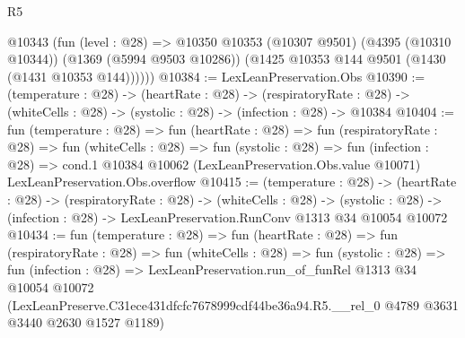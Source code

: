 \begin{lexlean}{R5}
\begin{coremodule}
      @10343
        (fun (level : @28) =>
        @10350
          @10353
          (@10307 @9501)
          (@4395 (@10310 @10344))
          (@1369 (@5994 @9503 @10286))
          (@1425 @10353 @144 @9501 (@1430 (@1431 @10353 @144))))))
@10384 := LexLeanPreservation.Obs
@10390 := (temperature : @28) ->
  (heartRate : @28) ->
  (respiratoryRate : @28) -> (whiteCells : @28) -> (systolic : @28) -> (infection : @28) -> @10384
@10404 := fun (temperature : @28) =>
  fun (heartRate : @28) =>
  fun (respiratoryRate : @28) =>
  fun (whiteCells : @28) =>
  fun (systolic : @28) =>
  fun (infection : @28) =>
  cond.{1} @10384 @10062 (LexLeanPreservation.Obs.value @10071) LexLeanPreservation.Obs.overflow
@10415 := (temperature : @28) ->
  (heartRate : @28) ->
  (respiratoryRate : @28) ->
  (whiteCells : @28) ->
  (systolic : @28) -> (infection : @28) -> LexLeanPreservation.RunConv @1313 @34 @10054 @10072
@10434 := fun (temperature : @28) =>
  fun (heartRate : @28) =>
  fun (respiratoryRate : @28) =>
  fun (whiteCells : @28) =>
  fun (systolic : @28) =>
  fun (infection : @28) =>
  LexLeanPreservation.run_of_funRel
    @1313
    @34
    @10054
    @10072
    (LexLeanPreserve.C31ece431dfcfc7678999cdf44be36a94.R5.__rel_0
      @4789
      @3631
      @3440
      @2630
      @1527
      @1189)
\end{coremodule}
\end{lexlean}
